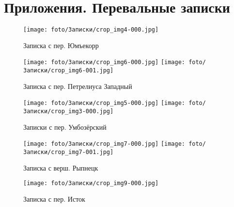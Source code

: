\newpage
\section{Приложения. Перевальные записки}
\begin{figure}[h]
    \centering
    \texttt{[image: foto/Записки/crop\_img4-000.jpg]}
    \caption{Записка с пер. Юмъекорр}
    \label{fig:zapiski1}
\end{figure}

\begin{figure}
    \centering
    \texttt{[image: foto/Записки/crop\_img6-000.jpg]}
    \texttt{[image: foto/Записки/crop\_img6-001.jpg]}
    \caption{Записка с пер. Петрелиуса Западный}
    \label{fig:zapiski2}
\end{figure}

\begin{figure}
    \centering
    \texttt{[image: foto/Записки/crop\_img5-000.jpg]}
    \texttt{[image: foto/Записки/crop\_img3-000.jpg]}
    \caption{Записки с пер. Умбозёрский}
    \label{fig:zapiski3}
\end{figure}

\begin{figure}
    \centering
    \texttt{[image: foto/Записки/crop\_img7-000.jpg]}
    \break
    \break
    \texttt{[image: foto/Записки/crop\_img7-001.jpg]}
    \caption{Записка с верш. Рыпнецк}
    \label{fig:zapiski4}
\end{figure}

\begin{figure}
    \centering
    \texttt{[image: foto/Записки/crop\_img9-000.jpg]}
    \caption{Записка с пер. Исток}
    \label{fig:zapiski5}
\end{figure}
